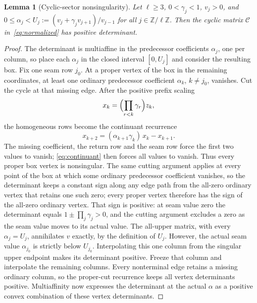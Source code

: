 \documentclass[11pt,reqno]{amsart}
\theoremstyle{plain}
\newtheorem{lemma}[theorem]{Lemma}
\theoremstyle{definition}
\theoremstyle{remark}
\numberwithin{equation}{section}
\newcommand{\Z}{\mathbb{Z}}
\begin{document}
\begin{lemma}[Cyclic-sector nonsingularity]\label{lem:cyclic}
Let $\ell\ge3$, $0<\gamma_j<1$, $v_j>0$, and $0\le\alpha_j<U_j:=(v_j+\gamma_jv_{j+1})/v_{j-1}$ for all $j\in\Z/\ell\Z$.  Then the cyclic matrix $\mathcal C$ in~\eqref{eq:normalized} has positive determinant.
\end{lemma}

\begin{proof}
The determinant is multiaffine in the predecessor coefficients $\alpha_j$, one per column, so place each $\alpha_j$ in the closed interval $[0,U_j]$ and consider the resulting box.  Fix one seam row $j_0$.  At a proper vertex of the box in the remaining coordinates, at least one ordinary predecessor coefficient $\alpha_k$, $k\ne j_0$, vanishes.  Cut the cycle at that missing edge.  After the positive prefix scaling
\begin{equation}\label{eq:scaling}
x_k=\Bigl(\prod_{r<k}\gamma_r\Bigr)z_k,
\end{equation}
the homogeneous rows become the continuant recurrence
\begin{equation}\label{eq:continuant}
x_{k+2}=(\alpha_{k+1}\gamma_k)\,x_k-x_{k+1} .
\end{equation}
The missing coefficient, the return row and the seam row force the first two values to vanish; \eqref{eq:continuant} then forces all values to vanish.  Thus every proper box vertex is nonsingular.  The same cutting argument applies at every point of the box at which some ordinary predecessor coefficient vanishes, so the determinant keeps a constant sign along any edge path from the all-zero ordinary vertex that retains one such zero; every proper vertex therefore has the sign of the all-zero ordinary vertex.  That sign is positive: at seam value zero the determinant equals $1\pm\prod_j\gamma_j>0$, and the cutting argument excludes a zero as the seam value moves to its actual value.  The all-upper matrix, with every $\alpha_j=U_j$, annihilates $v$ exactly, by the definition of $U_j$.  However, the actual seam value $\alpha_{j_0}$ is strictly below $U_{j_0}$.  Interpolating this one column from the singular upper endpoint makes its determinant positive.  Freeze that column and interpolate the remaining columns.  Every nonterminal edge retains a missing ordinary column, so the proper-cut recurrence keeps all vertex determinants positive.  Multiaffinity now expresses the determinant at the actual $\alpha$ as a positive convex combination of these vertex determinants.
\end{proof}
\end{document}
